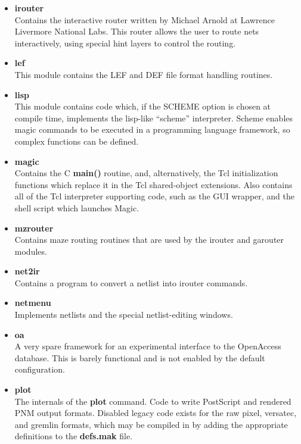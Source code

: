 \documentclass[letterpaper,twoside,12pt]{article}
\begin{document}
\begin{itemize}
\item {\bfseries irouter}  \\
Contains the interactive router written by Michael Arnold at Lawrence
Livermore National Labs.  This router allows the user to route nets
interactively,  using special hint layers to control the routing.

\item {\bfseries lef}  \\
This module contains the LEF and DEF file format handling routines.

\item {\bfseries lisp}  \\
This module contains code which, if the SCHEME option is chosen at
compile time, implements the lisp-like ``scheme'' interpreter.
Scheme enables magic commands to be executed in a programming
language framework, so complex functions can be defined.

\item {\bfseries magic}  \\
Contains the C {\bfseries main()} routine, and, alternatively, the
Tcl initialization functions which replace it in the Tcl shared-object
extensions.  Also contains all of the Tcl interpreter supporting code,
such as the GUI wrapper, and the shell script which launches Magic.

\item {\bfseries mzrouter}  \\
Contains maze routing routines that are used by the irouter and garouter
modules.

\item {\bfseries net2ir}  \\
Contains a program to convert a netlist into irouter commands.

\item {\bfseries netmenu}  \\
Implements netlists and the special netlist-editing windows.

\item {\bfseries oa}  \\
A very spare framework for an experimental interface to the OpenAccess
database.  This is barely functional and is not enabled by the default
configuration.

\item {\bfseries plot}  \\
The internals of the {\bfseries plot} command.  Code to write
PostScript and rendered PNM output formats.  Disabled legacy
code exists for the raw pixel, versatec, and gremlin formats,
which may be compiled in by adding the appropriate definitions
to the {\bfseries defs.mak} file.


\end{itemize}
\end{document}

